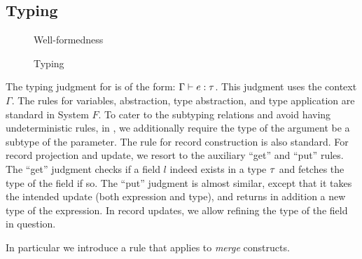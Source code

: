
\subsection{Typing}

\begin{figure}

\caption{Well-formedness}
\end{figure}

\begin{figure}



\caption{Typing}
\end{figure}

The typing judgment for \name is of the form: $ \Gamma \vdash e : \tau $. This
judgment uses the context $ \Gamma $. The rules for variables, abstraction, type
abstraction, and type application are standard in System $ F $. To cater to the
subtyping relations and avoid having undeterministic rules, in ,
we additionally require the type of the argument be a subtype of the parameter.
The rule for record construction is also standard. For record projection and
update, we resort to the auxiliary ``get'' and ``put'' rules. The ``get''
judgment checks if a field $ l $ indeed exists in a type $ \tau $ and fetches the
type of the field if so. The ``put'' judgment is almost similar, except that it
takes the intended update (both expression and type), and returns in addition a
new type of the expression. In record updates, we allow refining the type of the
field in question.


In particular we introduce a
 rule that applies to \emph{merge}
constructs.



